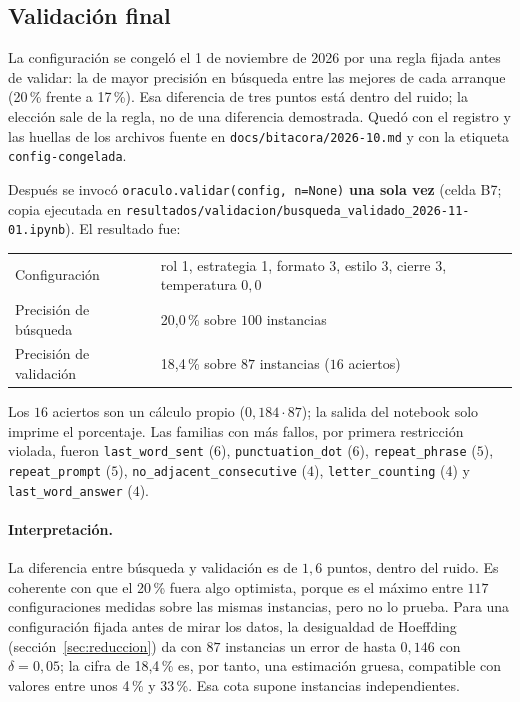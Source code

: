 \subsection{Validación final}

La configuración se congeló el 1 de noviembre de 2026 por una regla fijada antes de validar:
la de mayor precisión en búsqueda entre las mejores de cada arranque (20\,\% frente a
17\,\%). Esa diferencia de tres puntos está dentro del ruido; la elección sale de la
regla, no de una diferencia demostrada. Quedó con el registro y las huellas de los archivos
fuente en \texttt{docs/bitacora/2026-10.md} y con la etiqueta \texttt{config-congelada}.

Después se invocó \texttt{oraculo.validar(config, n=None)} \textbf{una sola vez} (celda B7;
copia ejecutada en \texttt{resultados/validacion/busqueda\_validado\_2026-11-01.ipynb}). El
resultado fue:

\begin{center}
\begin{tabular}{ll}
\toprule
Configuración & rol 1, estrategia 1, formato 3, estilo 3, cierre 3, temperatura $0{,}0$ \\
Precisión de búsqueda & 20{,}0\,\% sobre $100$ instancias \\
Precisión de validación & 18{,}4\,\% sobre $87$ instancias ($16$ aciertos) \\
\bottomrule
\end{tabular}
\end{center}

Los $16$ aciertos son un cálculo propio ($0{,}184\cdot87$); la salida del notebook solo
imprime el porcentaje. Las familias con más fallos, por primera restricción violada, fueron
\texttt{last\_word\_sent} ($6$), \texttt{punctuation\_dot} ($6$), \texttt{repeat\_phrase}
($5$), \texttt{repeat\_prompt} ($5$), \texttt{no\_adjacent\_consecutive} ($4$),
\texttt{letter\_counting} ($4$) y \texttt{last\_word\_answer} ($4$).

\paragraph{Interpretación.} La diferencia entre búsqueda y validación es de $1{,}6$ puntos,
dentro del ruido. Es coherente con que el 20\,\% fuera algo optimista, porque es el máximo
entre $117$ configuraciones medidas sobre las mismas instancias, pero no lo prueba. Para una
configuración fijada antes de mirar los datos, la desigualdad de Hoeffding
(sección~\ref{sec:reduccion}) da con $87$ instancias un error de hasta $0{,}146$ con
$\delta=0{,}05$; la cifra de 18{,}4\,\% es, por tanto, una estimación gruesa, compatible
con valores entre unos 4\,\% y 33\,\%. Esa cota supone instancias independientes.

